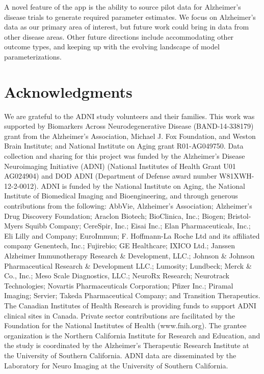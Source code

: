 A novel feature of the app is the ability to source pilot data for Alzheimer's disease trials to generate required parameter estimates. We focus on Alzheimer's data as our primary area of interest, but future work could bring in data from other disease areas. Other future directions include accommodating other outcome types, and keeping up with the evolving landscape of model parameterizations. 

\section*{Acknowledgments}
We are grateful to the ADNI study volunteers and their families. This work was supported by Biomarkers Across Neurodegenerative Disease (BAND-14-338179) grant from the Alzheimer's Association, Michael J. Fox Foundation, and Weston Brain Institute; and National Institute on Aging grant R01-AG049750. Data collection and sharing for this project was funded by the Alzheimer's Disease Neuroimaging Initiative (ADNI) (National Institutes of Health Grant U01 AG024904) and DOD ADNI (Department of Defense award number W81XWH-12-2-0012). ADNI is funded by the National Institute on Aging, the National Institute of Biomedical Imaging and Bioengineering, and through generous contributions from the following: AbbVie, Alzheimer's Association; Alzheimer's Drug Discovery Foundation; Araclon Biotech; BioClinica, Inc.; Biogen; Bristol-Myers Squibb Company; CereSpir, Inc.; Eisai Inc.; Elan Pharmaceuticals, Inc.; Eli Lilly and Company; EuroImmun; F. Hoffmann-La Roche Ltd and its affiliated company Genentech, Inc.; Fujirebio; GE Healthcare; IXICO Ltd.; Janssen Alzheimer Immunotherapy Research \& Development, LLC.; Johnson \& Johnson Pharmaceutical Research \& Development LLC.; Lumosity; Lundbeck; Merck \& Co., Inc.; Meso Scale Diagnostics, LLC.; NeuroRx Research; Neurotrack Technologies; Novartis Pharmaceuticals Corporation; Pfizer Inc.; Piramal Imaging; Servier; Takeda Pharmaceutical Company; and Transition Therapeutics. The Canadian Institutes of Health Research is providing funds to support ADNI clinical sites in Canada. Private sector contributions are facilitated by the Foundation for the National Institutes of Health (www.fnih.org). The grantee organization is the Northern California Institute for Research and Education, and the study is coordinated by the Alzheimer's Therapeutic Research Institute at the University of Southern California. ADNI data are disseminated by the Laboratory for Neuro Imaging at the University of Southern California.\\

